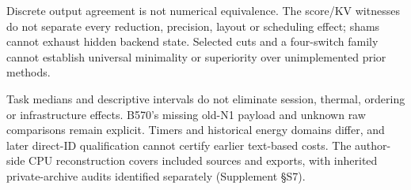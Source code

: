 Discrete output agreement is not numerical equivalence. The score/KV witnesses do not separate every reduction, precision, layout or scheduling effect; shams cannot exhaust hidden backend state. Selected cuts and a four-switch family cannot establish universal minimality or superiority over unimplemented prior methods.

Task medians and descriptive intervals do not eliminate session, thermal, ordering or infrastructure effects. B570's missing old-N1 payload and unknown raw comparisons remain explicit. Timers and historical energy domains differ, and later direct-ID qualification cannot certify earlier text-based costs. The author-side CPU reconstruction covers included sources and exports, with inherited private-archive audits identified separately (Supplement \S S7).
